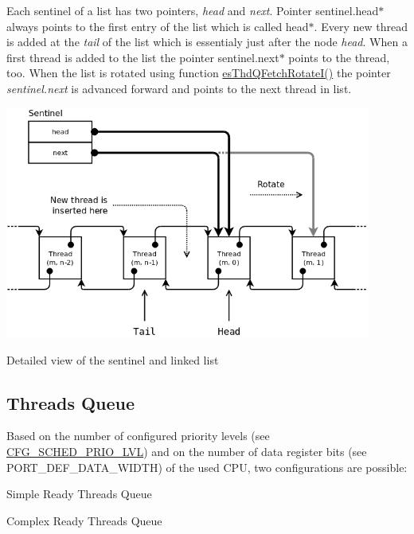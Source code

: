 Each sentinel of a list has two pointers, {\itshape head} and {\itshape next}. Pointer sentinel.\-head$\ast$ always points to the first entry of the list which is called head$\ast$. Every new thread is added at the {\itshape tail} of the list which is essentialy just after the node {\itshape head}. When a first thread is added to the list the pointer sentinel.\-next$\ast$ points to the thread, too. When the list is rotated using function \hyperlink{group__kern__thdq_gae365b14292f1496a90d876baec84fb4e}{es\-Thd\-Q\-Fetch\-Rotate\-I()} the pointer {\itshape sentinel.\-next} is advanced forward and points to the next thread in list.


\begin{DoxyImage}
\includegraphics[width=12cm]{thdL-rotate.png}
\caption{Detailed view of the sentinel and linked list}
\end{DoxyImage}
\hypertarget{scheduler_sched_thdQ}{}\subsection{Threads Queue}\label{scheduler_sched_thdQ}
Based on the number of configured priority levels (see \hyperlink{group__template__kern__cfg_ga56bd89fe76f7fe22f3d8805bc3c68892}{C\-F\-G\-\_\-\-S\-C\-H\-E\-D\-\_\-\-P\-R\-I\-O\-\_\-\-L\-V\-L}) and on the number of data register bits (see {\ttfamily P\-O\-R\-T\-\_\-\-D\-E\-F\-\_\-\-D\-A\-T\-A\-\_\-\-W\-I\-D\-T\-H}) of the used C\-P\-U, two configurations are possible\-:
\begin{DoxyItemize}
\item Simple Ready Threads Queue
\item Complex Ready Threads Queue
\end{DoxyItemize}

